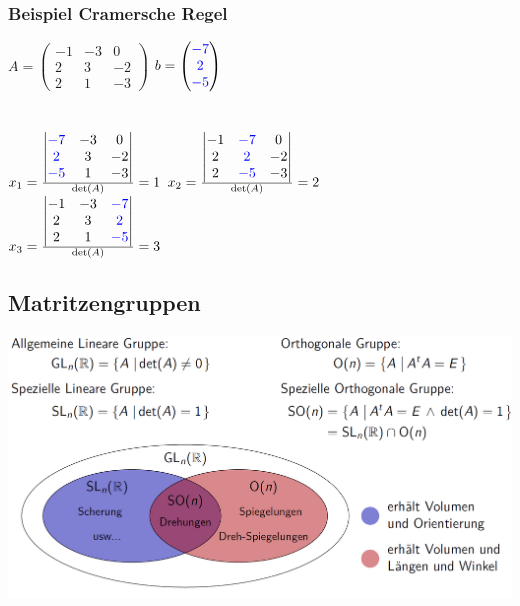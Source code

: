 			\subsubsection{Beispiel Cramersche Regel}
			$A = \begin{pmatrix}
				-1 & -3 & 0 \\
				2 & 3 & -2 \\
				2 & 1 & -3
				\end{pmatrix}$ \qquad $b = \begin{pmatrix}											\color{blue}-7 \\ \color{blue}2 \\ \color{blue}-5	
											\end{pmatrix}$ \\
				\\		
				\\ $x_1 = \frac{\begin{vmatrix}
							\color{blue}-7 & -3 & 0 \\
							\color{blue}2 & 3 & -2 \\
							\color{blue}-5 & 1 & -3 \\
							\end{vmatrix}}{\det(A)} = 1$ \qquad  $x_2 = \frac{\begin{vmatrix}
							-1 & \color{blue}-7 & 0 \\
							2 & \color{blue}2 & -2 \\
							2 & \color{blue}-5 & -3 \\
							\end{vmatrix}}{\det(A)} = 2$ \\
							
							\vspace{0.2cm}
				$x_3 = \frac{\begin{vmatrix}
							-1 & -3 & \color{blue}-7 \\
							2 & 3 & \color{blue}2 \\
							2 & 1 & \color{blue}-5 \\
							\end{vmatrix}}{\det(A)} = 3$ \\			
		    
		    
			\subsection{Matritzengruppen}	
			 \includegraphics[width=0.8\linewidth]{Bilder/matritzengruppen} \\
		    